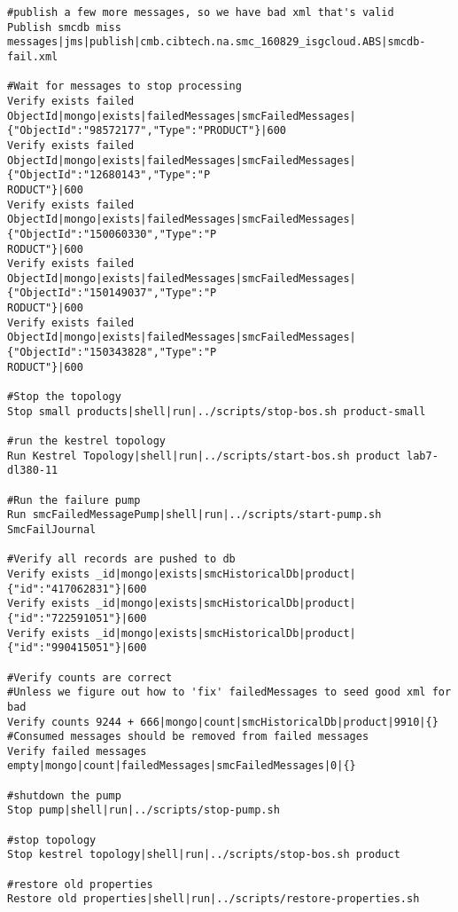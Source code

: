 \documentclass[12pt,a4paper,koma]{article}
\begin{document}
\begin{scriptsize}
\begin{verbatim}
#publish a few more messages, so we have bad xml that's valid
Publish smcdb miss messages|jms|publish|cmb.cibtech.na.smc_160829_isgcloud.ABS|smcdb-fail.xml

#Wait for messages to stop processing
Verify exists failed ObjectId|mongo|exists|failedMessages|smcFailedMessages|{"ObjectId":"98572177","Type":"PRODUCT"}|600
Verify exists failed ObjectId|mongo|exists|failedMessages|smcFailedMessages|{"ObjectId":"12680143","Type":"P
RODUCT"}|600
Verify exists failed ObjectId|mongo|exists|failedMessages|smcFailedMessages|{"ObjectId":"150060330","Type":"P
RODUCT"}|600
Verify exists failed ObjectId|mongo|exists|failedMessages|smcFailedMessages|{"ObjectId":"150149037","Type":"P
RODUCT"}|600
Verify exists failed ObjectId|mongo|exists|failedMessages|smcFailedMessages|{"ObjectId":"150343828","Type":"P
RODUCT"}|600

#Stop the topology
Stop small products|shell|run|../scripts/stop-bos.sh product-small

#run the kestrel topology
Run Kestrel Topology|shell|run|../scripts/start-bos.sh product lab7-dl380-11

#Run the failure pump
Run smcFailedMessagePump|shell|run|../scripts/start-pump.sh SmcFailJournal

#Verify all records are pushed to db
Verify exists _id|mongo|exists|smcHistoricalDb|product|{"id":"417062831"}|600
Verify exists _id|mongo|exists|smcHistoricalDb|product|{"id":"722591051"}|600
Verify exists _id|mongo|exists|smcHistoricalDb|product|{"id":"990415051"}|600

#Verify counts are correct
#Unless we figure out how to 'fix' failedMessages to seed good xml for bad
Verify counts 9244 + 666|mongo|count|smcHistoricalDb|product|9910|{}
#Consumed messages should be removed from failed messages
Verify failed messages empty|mongo|count|failedMessages|smcFailedMessages|0|{}

#shutdown the pump
Stop pump|shell|run|../scripts/stop-pump.sh

#stop topology
Stop kestrel topology|shell|run|../scripts/stop-bos.sh product

#restore old properties
Restore old properties|shell|run|../scripts/restore-properties.sh
\end{verbatim}
\end{scriptsize}
\end{document}
